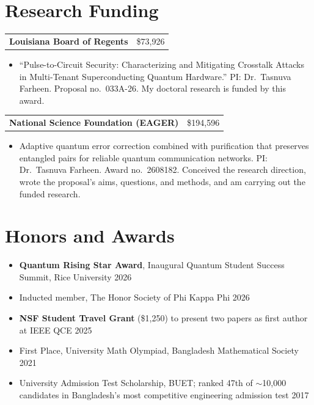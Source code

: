 \documentclass[letterpaper,11pt]{article}
\makeatletter
\newcommand{\cvline}[2]{%
  \begin{tabularx}{\textwidth}{@{}X r@{}}
    \textbf{#1} & #2
  \end{tabularx}\par\vspace{1pt}}
\newenvironment{cvblock}
  {\par\noindent\begin{minipage}[t]{\textwidth}\raggedright}
  {\end{minipage}\par\vspace{5pt}}
\makeatother
\begin{document}
\section{Research Funding}
\begin{cvblock}
\cvline{Louisiana Board of Regents}{\$73,926}
\begin{itemize}
  \item ``Pulse-to-Circuit Security: Characterizing and Mitigating Crosstalk Attacks in Multi-Tenant Superconducting Quantum Hardware.'' PI: Dr.~Tasnuva Farheen. Proposal no.~033A-26. My doctoral research is funded by this award.
\end{itemize}
\cvline{National Science Foundation (EAGER)}{\$194,596}
\begin{itemize}
  \item Adaptive quantum error correction combined with purification that preserves entangled pairs for reliable quantum communication networks. PI: Dr.~Tasnuva Farheen. Award no.~2608182. Conceived the research direction, wrote the proposal's aims, questions, and methods, and am carrying out the funded research.
\end{itemize}

\end{cvblock}

\section{Honors and Awards}
\begin{cvblock}
\begin{itemize}
  \item \textbf{Quantum Rising Star Award}, Inaugural Quantum Student Success Summit, Rice University \hfill 2026
  \item Inducted member, The Honor Society of Phi Kappa Phi \hfill 2026
  \item \textbf{NSF Student Travel Grant} (\$1,250) to present two papers as first author at IEEE QCE \hfill 2025
  \item First Place, University Math Olympiad, Bangladesh Mathematical Society \hfill 2021
  \item University Admission Test Scholarship, BUET; ranked 47th of $\sim$10,000 candidates in Bangladesh's most competitive engineering admission test \hfill 2017
\end{itemize}

\end{cvblock}
\end{document}
